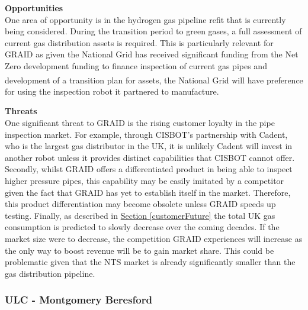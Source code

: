 \documentclass[11pt]{article}		%
\newcommand{\supercite}[1]{\textsuperscript{\cite{#1}}}		%
\newcommand{\sectref}[1]{\hyperref[#1]{Section \ref*{#1}}}     %
\begin{document}
	        \textbf{Opportunities}\\
	        One area of opportunity is in the hydrogen gas pipeline refit that is currently being considered. During the transition period to green gases, a full assessment of current gas distribution assets is required. This is particularly relevant for GRAID as given the National Grid has received significant funding from the Net Zero development funding to finance inspection of current gas pipes and development of a transition plan for assets\supercite{developmentfund}, the National Grid will have preference for using the inspection robot it partnered to manufacture.
	        
	        \textbf{Threats} \\
	        One significant threat to GRAID is the rising customer loyalty in the pipe inspection market. For example, through CISBOT's partnership with Cadent, who is the largest gas distributor in the UK, it is unlikely Cadent will invest in another robot unless it provides distinct capabilities that CISBOT cannot offer. Secondly, whilst GRAID offers a differentiated product in being able to inspect higher pressure pipes, this capability may be easily imitated by a competitor given the fact that GRAID has yet to establish itself in the market. Therefore, this product differentiation may become obsolete unless GRAID speeds up testing.
	        Finally, as described in \sectref{customerFuture} the total UK gas consumption is predicted to slowly decrease over the coming decades. If the market size were to decrease, the competition GRAID experiences will increase as the only way to boost revenue will be to gain market share. This could be problematic given that the NTS market is already significantly smaller than the gas distribution pipeline.  
	        
     	\subsubsection[ULC]{ULC - Montgomery Beresford}
     	
\end{document}
